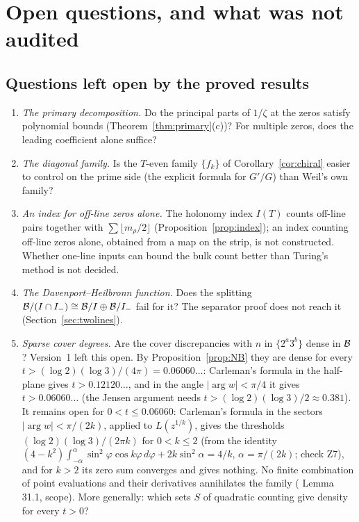 \section{Open questions, and what was not audited}\label{sec:open}

\subsection{Questions left open by the proved results}

\begin{enumerate}[label=\arabic*.]
\item \emph{The primary decomposition.} Do the principal parts of $1/\zeta$ at the zeros satisfy polynomial bounds (Theorem~\ref{thm:primary}(c))? For multiple zeros, does the leading coefficient alone suffice?
\item \emph{The diagonal family.} Is the $T$-even family $\{f_k\}$ of Corollary~\ref{cor:chiral} easier to control on the prime side (the explicit formula for $G'/G$) than Weil's own family?
\item \emph{An index for off-line zeros alone.} The holonomy index $I(T)$ counts off-line pairs together with $\sum\lfloor m_\rho/2\rfloor$ (Proposition~\ref{prop:index}); an index counting off-line zeros alone, obtained from a map on the strip, is not constructed. Whether one-line inputs can bound the bulk count better than Turing's method is not decided.
\item \emph{The Davenport--Heilbronn function.} Does the splitting $\mathcal{B}/(I\cap I_-)\cong\mathcal{B}/I\oplus\mathcal{B}/I_-$ fail for it? The separator proof does not reach it (Section~\ref{sec:twolines}).
\item \emph{Sparse cover degrees.} Are the cover discrepancies with $n$ in $\{2^a3^b\}$ dense in $\mathcal{B}$? Version~1 left this open. By Proposition~\ref{prop:NB} they are dense for every $t>(\log2)(\log3)/(4\pi)=0.06060\ldots$: Carleman's formula in the half-plane gives $t>0.12120\ldots$, and in the angle $|\arg w|<\pi/4$ it gives $t>0.06060\ldots$ (the Jensen argument needs $t>(\log2)(\log3)/2\approx0.381$). It remains open for $0<t\le0.06060$: Carleman's formula in the sectors $|\arg w|<\pi/(2k)$, applied to $L(z^{1/k})$, gives the thresholds $(\log2)(\log3)/(2\pi k)$ for $0<k\le2$ (from the identity $(4-k^2)\int_{-\alpha}^{\alpha}\sin^2\varphi\cos k\varphi\,d\varphi+2k\sin^2\alpha=4/k$, $\alpha=\pi/(2k)$; check Z7), and for $k>2$ its zero sum converges and gives nothing. No finite combination of point evaluations and their derivatives annihilates the family ( Lemma 31.1, scope). More generally: which sets $S$ of quadratic counting give density for every $t>0$?

\end{enumerate}
